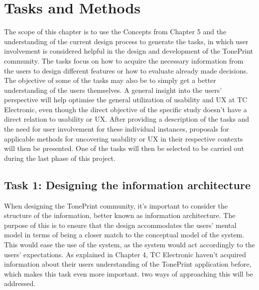 \chapter{Tasks and Methods}
\label{TaskAndMethods}
The scope of this chapter is to use the Concepts from Chapter 5  and the understanding of the current design process to generate the tasks, in which user involvement is considered helpful in the design and development of the TonePrint community. The tasks focus on how to acquire the necessary information from the users to design different features or how to evaluate already made decisions. The objective of some of the tasks may also be to simply get a better understanding of the users themselves. A general insight into the users' perspective will help optimise the general utilization of usability and UX at TC Electronic, even though the direct objective of the specific study doesn't have a direct relation to usability or UX. After providing a description of the tasks and the need for user involvement for these individual instances, proposals for applicable methods for uncovering usability or UX in their respective contexts will then be presented. One of the tasks will then be selected to be carried out during the last phase of this project.


\section{Task 1: Designing the information architecture}
\label{Task1}
When designing the TonePrint community, it's important to consider the structure of the information, better known as information architecture. The purpose of this is to ensure that the design accommodates the users' mental model in terms of being a closer match to the conceptual model of the system. This would ease the use of the system, as the system would act accordingly to the users' expectations. As explained in Chapter 4, TC Electronic haven't acquired information about their users understanding of the TonePrint application before, which makes this task even more important. two ways of approaching this will be addressed. \\

